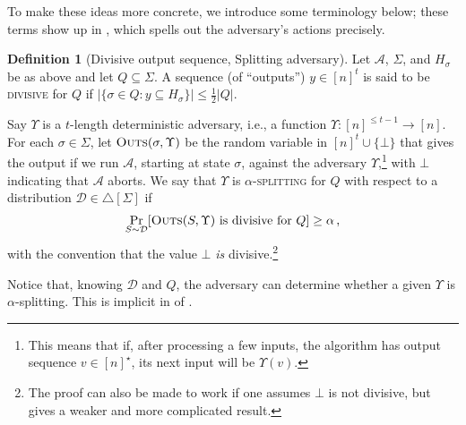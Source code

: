 \documentclass[10pt,a4paper]{article}
\theoremstyle{definition}
\newtheorem{definition}[theorem]{Definition}
\theoremstyle{remark}
\newcommand{\cA}{\mathcal{A}}
\newcommand{\cD}{\mathcal{D}}
\newcommand{\mif}{\textsc{mif}\xspace}
\newcommand{\rl}{\mathbf{\ell}}             %
\newcommand{\Outs}{\textsc{Outs}\xspace}    %
\begin{document}
\begin{itemize}
\begin{itemize}
To make these ideas more concrete, we introduce some terminology below; these
terms show up in , which spells out the adversary's
actions precisely.
%
\begin{definition}[Divisive output sequence, Splitting adversary]\label{def:rt-defs}
  Let $\cA$, $\Sigma$, and $H_\sigma$ be as above and let $Q \subseteq
  \Sigma$.  A sequence (of ``outputs'') $y \in [n]^t$ is said to be
  \textsc{divisive} for $Q$ if $|\{\sigma \in Q : y \subseteq H_\sigma\}| \le
  \frac{1}{2} |Q|$.

  Say $\Upsilon$ is a $t$-length deterministic adversary, i.e., a function
  $\Upsilon \colon [n]^{\le t-1} \to [n]$.  For each $\sigma \in \Sigma$, let
  $\Outs(\sigma, \Upsilon)$ be the random variable in $[n]^t \cup \{\bot\}$
  that gives the output if we run $\cA$, starting at state $\sigma$, against
  the adversary $\Upsilon$,\footnote{This means that if, after processing a
  few inputs, the algorithm has output sequence $v \in [n]^\star$, its next
  input will be $\Upsilon(v)$.} with $\bot$ indicating that $\cA$ aborts. 
  We say that $\Upsilon$ is $\alpha$-\textsc{splitting} for $Q$ with respect
  to a distribution $\cD \in \triangle[\Sigma]$ if
  \begin{align*}
    \Pr_{S \sim \cD}[\text{$\Outs(S, \Upsilon)$ is divisive for $Q$}] \ge \alpha \,,
  \end{align*} 
  with the convention that the value $\bot$ \emph{is} divisive.\footnote{The proof can also be made to work if one assumes $\bot$ is not divisive, but gives a weaker and more complicated result.}
\end{definition}

Notice that, knowing $\cD$ and $Q$, the adversary can determine whether a
given $\Upsilon$ is $\alpha$-splitting. This is implicit in 
 of .

\end{itemize}
\end{itemize}
\end{document}
